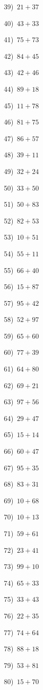 \documentclass{article}
\begin{document}
\begin{multicols}{2}
39)$\,\,\,21+37$ \par 
40)$\,\,\,43+33$ \par 
41)$\,\,\,75+73$ \par 
42)$\,\,\,84+45$ \par 
43)$\,\,\,42+46$ \par 
44)$\,\,\,89+18$ \par 
45)$\,\,\,11+78$ \par 
46)$\,\,\,81+75$ \par 
47)$\,\,\,86+57$ \par 
48)$\,\,\,39+11$ \par 
49)$\,\,\,32+24$ \par 
50)$\,\,\,33+50$ \par 
51)$\,\,\,50+83$ \par 
52)$\,\,\,82+53$ \par 
53)$\,\,\,10+51$ \par 
54)$\,\,\,55+11$ \par 
55)$\,\,\,66+40$ \par 
56)$\,\,\,15+87$ \par 
57)$\,\,\,95+42$ \par 
58)$\,\,\,52+97$ \par 
59)$\,\,\,65+60$ \par 
60)$\,\,\,77+39$ \par 
61)$\,\,\,64+80$ \par 
62)$\,\,\,69+21$ \par 
63)$\,\,\,97+56$ \par 
64)$\,\,\,29+47$ \par 
65)$\,\,\,15+14$ \par 
66)$\,\,\,60+47$ \par 
67)$\,\,\,95+35$ \par 
68)$\,\,\,83+31$ \par 
69)$\,\,\,10+68$ \par 
70)$\,\,\,10+13$ \par 
71)$\,\,\,59+61$ \par 
72)$\,\,\,23+41$ \par 
73)$\,\,\,99+10$ \par 
74)$\,\,\,65+33$ \par 
75)$\,\,\,33+43$ \par 
76)$\,\,\,22+35$ \par 
77)$\,\,\,74+64$ \par 
78)$\,\,\,88+18$ \par 
79)$\,\,\,53+81$ \par 
80)$\,\,\,15+70$ \par 

\end{multicols}
\end{document}
